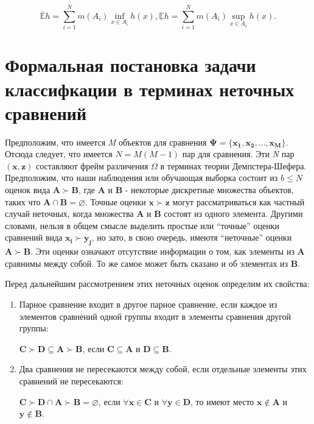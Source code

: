 \documentclass[12pt,a4paper,oneside]{article}
\begin{document}
\[
\mathbb{\overline{E}} h = \sum \limits_{i=1}^N m(A_i) \inf_{x \in A_i} h(x), 
\mathbb{\underline{E}} h = \sum \limits_{i=1}^N m(A_i) \sup_{x \in A_i} h(x).
\]


\section{Формальная постановка задачи классифкации в терминах неточных сравнений}
\label{sec:classification_problem_by_imprecise_comparisons}

\par
Предположим, что имеется \emph{M} объектов для сравнения \(\mathbf{\Psi} = \{\mathbf{x_1}, \mathbf{x_2}, \dots, \mathbf{x_M}\}\). 
Отсюда следует, что имеется \(N = M(M - 1)\) пар для сравнения. 
Эти \emph{N} пар \((\mathbf{x}, \mathbf{z})\) составляют фрейм различения \(\Omega\) в терминах теории Демпстера-Шефера. 
Предположим, что наши наблюдения или обучающая выборка состоит из \(b \leq N\) оценок вида \(\mathbf{A} \succ \mathbf{B}\), где \(\mathbf{A}\) и \(\mathbf{B}\) - некоторые дискретные множества объектов, таких что \(\mathbf{A} \cap \mathbf{B} = \varnothing\).  
Точные оценки \(\mathbf{x} \succ \mathbf{z}\) могут рассматриваться как частный случай неточных, когда множества \(\mathbf{A}\) и \(\mathbf{B}\) состоят из одного элемента. 
Другими словами, нельзя в общем смысле выделить простые или ``точные'' оценки сравнений вида \(\mathbf{x_i} \succ \mathbf{y_j}\), но зато, в свою очередь, имеютя ``неточные'' оценки \(\mathbf{A} \succ \mathbf{B}\). 
Эти оценки означают отсутствие информации о том, как элементы из \(\mathbf{A}\) сравнимы между собой. 
То же самое может быть сказано и об элементах из \(\mathbf{B}\). 

\par
Перед дальнейшим рассмотрением этих неточных оценок определим их свойства:

\begin{enumerate}
\item Парное сравнение входит в другое парное сравнение, если каждое из элементов сравнений одной группы входит в элементы сравнения другой группы:

\begin{center}
\(\mathbf{C} \succ \mathbf{D} \subseteq \mathbf{A} \succ \mathbf{B}\), если \(\mathbf{C} \subseteq \mathbf{A}\) и \(\mathbf{D} \subseteq \mathbf{B}\).
\end{center}

\item Два сравнения не пересекаются между собой, если отдельные элементы этих сравнений не пересекаются:

\begin{center}
\(\mathbf{C} \succ \mathbf{D} \cap \mathbf{A} \succ \boldsymbol{B} = \varnothing\), если \(\forall\mathbf{x} \in \mathbf{C}\) и \(\forall\mathbf{y} \in \mathbf{D}\), то имеют место \(\mathbf{x} \notin \mathbf{A}\) и \(\mathbf{y} \notin \mathbf{B}\).
\end{center}

\end{enumerate}
\end{document}
